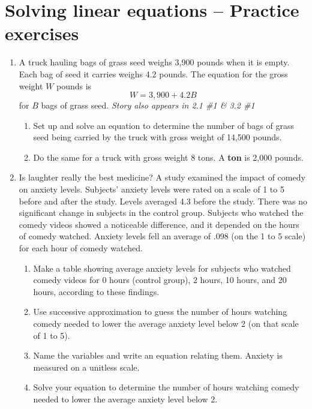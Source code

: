 
\section{Solving linear equations -- Practice exercises}

\begin{enumerate}

\item A truck hauling bags of grass seed weighs 3,900 pounds when it is empty.  Each bag of seed it carries weighs 4.2 pounds.   The equation for the gross weight $W$ pounds is $$W = 3,900 + 4.2B$$ for $B$ bags of grass seed.  \hfill \emph{Story also appears in 2.1 \#1 \& 3.2 \#1}
\begin{enumerate} 
\item Set up and solve an equation to determine the number of bags of grass seed being carried by the truck with gross weight of 14,500 pounds. \vfill
\item Do the same for a truck with gross weight 8 tons. A \textbf{ton} is 2,000 pounds. \vfill \vfill
\end{enumerate} 

\newpage %

\item Is laughter really the best medicine?  A study examined the impact of comedy on anxiety levels.  Subjects' anxiety levels were rated on a scale of 1 to 5 before and after the study.  Levels averaged 4.3 before the study.  There was no significant change in subjects in the control group.  Subjects who watched the comedy videos showed a noticeable difference, and it depended on the hours of comedy watched.  Anxiety levels fell an average of .098 (on the 1 to 5 scale) for each hour of comedy watched.
\begin{enumerate}
\item Make a table showing average anxiety levels for subjects who watched comedy videos for 0 hours (control group), 2 hours, 10 hours, and 20 hours, according to these findings.  \vfill
\item Use successive approximation to guess the number of hours watching comedy needed to lower the average anxiety level below 2 (on that scale of 1 to 5). \vfill
\item Name the variables and write an equation relating them.  Anxiety is measured on a unitless scale. \vfill
\item Solve your equation to determine the number of hours watching comedy needed to lower the average anxiety level below 2. \vfill
\end{enumerate}


\end{enumerate}
